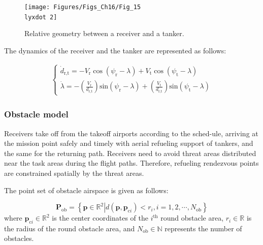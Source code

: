 \begin{figure}
	\begin{centering}
		\texttt{[image: Figures/Figs\_Ch16/Fig\_15\\lyxdot 2]}
		\par\end{centering}
	\caption{Relative geometry between a receiver and a tanker.\cite{yoon2018three}}
	\centering{}\label{Fig_15.2}
\end{figure}



The dynamics of the receiver and the tanker are represented as follows:\cite{yoon2018three}

\begin{equation}
\begin{aligned}&\begin{cases}\dot{d}_\text{r,t}=-V_\text{r}\cos\left(\psi_\text{r}-\lambda\right)+V_\text{t}\cos\left(\psi_\text{t}-\lambda\right)\\\dot{\lambda}=-\left(\frac{V_\text{r}}{d_\text{r,t}}\right)\text{sin}\left(\psi_\text{r}-\lambda\right)+\left(\frac{V_\text{t}}{d_\text{r,t}}\right)\text{sin}\left(\psi_\text{t}-\lambda\right)&\end{cases}\end{aligned}
\label{eq:15.9}
\end{equation}	 


\subsubsection{Obstacle model}
Receivers take off from the takeoff airports according to the sched-ule, arriving at the mission point safely and timely with aerial refueling support of tankers, and the same for the returning path. Receivers need to avoid threat areas distributed near the task areas during the flight paths. Therefore, refueling rendezvous points are constrained spatially by the threat areas. 

The point set of obstacle airspace is given as follows:

\begin{equation}
\mathbf{P}_{\text{ob}}=\left\{\left.\mathbf{p}\in\mathbb{R}^2\right|d\left(\mathbf{p},\mathbf{p}_{\text{c}i}\right)<r_i,i=1,2,\cdots,N_{\text{ob}}\right\}
\label{eq:15.10}
\end{equation}	 
where $\mathbf{p}_{\text{c}i}\in\mathbb{R}^2$ is the center coordinates of the $i^{\text{th}}$ round obstacle area,  $r_{i}\in\mathbb{R}$ is the radius of the round obstacle area, and $N_{\text{ob}}\in\mathbb{N}$ represents the number of obstacles.

